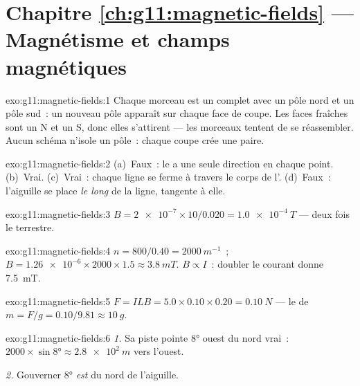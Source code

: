 \section*{Chapitre \ref{ch:g11:magnetic-fields} --- Magnétisme et champs magnétiques}

\begin{solution}{exo:g11:magnetic-fields:1}
Chaque morceau est un  complet avec un
pôle nord et un pôle sud~: un nouveau pôle apparaît sur chaque face de
coupe. Les faces fraîches sont un N et un S, donc elles s'attirent ---
les morceaux tentent de se réassembler. Aucun schéma n'isole un pôle~:
chaque coupe crée une paire.
\end{solution}

\begin{solution}{exo:g11:magnetic-fields:2}
(a)~Faux~: le  a une seule
direction en chaque point. (b)~Vrai. (c)~Vrai~: chaque ligne se ferme à
travers le corps de l'. (d)~Faux~:
l'aiguille se place \emph{le long} de la ligne, tangente à elle.
\end{solution}

\begin{solution}{exo:g11:magnetic-fields:3}
$B = \num{2e-7} \times 10 / 0.020 = \qty{1.0e-4}{T}$ --- deux fois le
 terrestre.
\end{solution}

\begin{solution}{exo:g11:magnetic-fields:4}
$n = 800/0.40 = \qty{2000}{m^{-1}}$~;
$B = \num{1.26e-6} \times 2000 \times 1.5 \approx \qty{3.8}{mT}$.
$B \propto I$~: doubler le courant donne \qty{7.5}{mT}.
\end{solution}

\begin{solution}{exo:g11:magnetic-fields:5}
$F = ILB = 5.0 \times 0.10 \times 0.20 = \qty{0.10}{N}$ --- le
 de $m = F/g = 0.10/9.81 \approx
\qty{10}{g}$.
\end{solution}

\begin{solution}{exo:g11:magnetic-fields:6}
\emph{1.} Sa piste pointe $\ang{8}$ ouest du nord vrai~:
$2000 \times \sin\ang{8} \approx \qty{2.8e2}{m}$ vers l'ouest.

\emph{2.} Gouverner $\ang{8}$ \emph{est} du nord de l'aiguille.
\end{solution}

